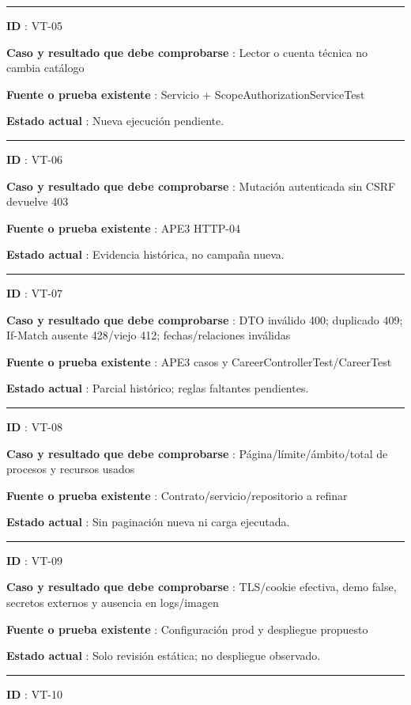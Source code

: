 \documentclass[12pt,a4paper]{report}
\begin{document}
\medskip\hrule\medskip

\textbf{ID }: VT-05

\textbf{Caso y resultado que debe comprobarse }: Lector o cuenta técnica
no cambia catálogo

\textbf{Fuente o prueba existente }: Servicio +
ScopeAuthorizationServiceTest

\textbf{Estado actual }: Nueva ejecución pendiente.

\medskip\hrule\medskip

\textbf{ID }: VT-06

\textbf{Caso y resultado que debe comprobarse }: Mutación autenticada
sin CSRF devuelve 403

\textbf{Fuente o prueba existente }: APE3 HTTP-04

\textbf{Estado actual }: Evidencia histórica, no campaña nueva.

\medskip\hrule\medskip

\textbf{ID }: VT-07

\textbf{Caso y resultado que debe comprobarse }: DTO inválido 400;
duplicado 409; If-Match ausente 428/viejo 412; fechas/relaciones
inválidas

\textbf{Fuente o prueba existente }: APE3 casos y
CareerControllerTest/CareerTest

\textbf{Estado actual }: Parcial histórico; reglas faltantes pendientes.

\medskip\hrule\medskip

\textbf{ID }: VT-08

\textbf{Caso y resultado que debe comprobarse
}: Página/límite/ámbito/total de procesos y recursos usados

\textbf{Fuente o prueba existente }: Contrato/servicio/repositorio a
refinar

\textbf{Estado actual }: Sin paginación nueva ni carga ejecutada.

\medskip\hrule\medskip

\textbf{ID }: VT-09

\textbf{Caso y resultado que debe comprobarse }: TLS/cookie efectiva,
demo false, secretos externos y ausencia en logs/imagen

\textbf{Fuente o prueba existente }: Configuración prod y despliegue
propuesto

\textbf{Estado actual }: Solo revisión estática; no despliegue
observado.

\medskip\hrule\medskip

\textbf{ID }: VT-10
\end{document}
